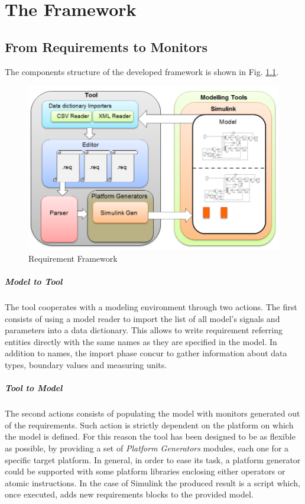 \chapter{The Framework}

\section{From Requirements to Monitors}

The components structure of the developed framework is shown in Fig. \ref{fig:tool}.
\begin{figure}[!h]
	\centering 
     \includegraphics[width=.9\textwidth]{Figs/tool.PNG} 
     \caption{Requirement Framework} 
     \label{fig:tool} 
\end{figure}
\paragraph{Model to Tool} The tool cooperates with a modeling environment through two actions. The first consists of using a model reader to import the list of all model's signals and parameters into a data dictionary. This allows to write requirement referring entities directly with the same names as they are specified in the model. In addition to names, the import phase concur to gather information about data types, boundary values and measuring units.
\paragraph{Tool to Model} The second actions consists of populating the model with monitors generated out of the requirements. Such action is strictly dependent on the platform on which the model is defined. For this reason the tool has been designed to be as flexible as possible, by providing a set of \textit{{Platform Generators}} modules, each one for a specific target platform. In general, in order to ease its task, a platform generator could be supported with some platform libraries enclosing either operators or atomic instructions. In the case of Simulink the produced result is a script which, once executed, adds new requirements blocks to the provided model.
